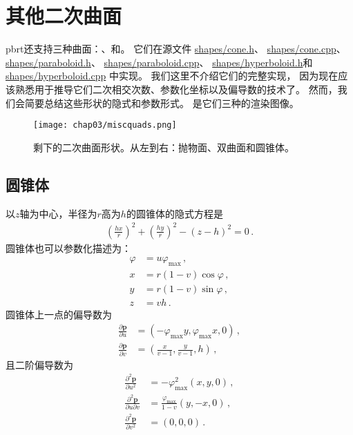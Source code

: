\section{其他二次曲面}\label{sec:其他二次曲面}
pbrt还支持三种曲面：、和。
它们在源文件
\href{https://github.com/mmp/pbrt-v3/tree/master/src/shapes/cone.h}{\ttfamily shapes/cone.h}、
\href{https://github.com/mmp/pbrt-v3/tree/master/src/shapes/cone.cpp}{\ttfamily shapes/cone.cpp}、
\href{https://github.com/mmp/pbrt-v3/tree/master/src/shapes/paraboloid.h}{\ttfamily shapes/paraboloid.h}、
\href{https://github.com/mmp/pbrt-v3/tree/master/src/shapes/paraboloid.cpp}{\ttfamily shapes/paraboloid.cpp}、
\href{https://github.com/mmp/pbrt-v3/tree/master/src/shapes/hyperboloid.h}{\ttfamily shapes/hyperboloid.h}和
\href{https://github.com/mmp/pbrt-v3/tree/master/src/shapes/hyperboloid.cpp}{\ttfamily shapes/hyperboloid.cpp}
中实现。
我们这里不介绍它们的完整实现，
因为现在应该熟悉用于推导它们二次相交次数、参数化坐标以及偏导数的技术了。
然而，我们会简要总结这些形状的隐式和参数形式。
是它们三种的渲染图像。
\begin{figure}[htbp]
    \centering\texttt{[image: chap03/miscquads.png]}
    \caption{剩下的二次曲面形状。从左到右：抛物面、双曲面和圆锥体。}
    \label{fig:3.10}
\end{figure}

\subsection{圆锥体}\label{sub:圆锥体}
以$z$轴为中心，半径为$r$高为$h$的圆锥体的隐式方程是
\begin{align*}
    \left(\frac{hx}{r}\right)^2+\left(\frac{hy}{r}\right)^2-(z-h)^2=0\, .
\end{align*}
圆锥体也可以参数化描述为：
\begin{align*}
    \varphi & =u\varphi_{\max}\, ,   \\
    x       & =r(1-v)\cos\varphi\, , \\
    y       & =r(1-v)\sin\varphi\, , \\
    z       & =vh\, .
\end{align*}
圆锥体上一点的偏导数为
\begin{align*}
    \frac{\partial\bm p}{\partial u} & =(-\varphi_{\max}y,\varphi_{\max}x,0)\, ,       \\
    \frac{\partial\bm p}{\partial v} & =\left(\frac{x}{v-1},\frac{y}{v-1},h\right)\, ,
\end{align*}
且二阶偏导数为
\begin{align*}
    \frac{\partial^2\bm p}{\partial u^2}         & =-\varphi_{\max}^2(x,y,0)\, ,           \\
    \frac{\partial^2\bm p}{\partial u\partial v} & =\frac{\varphi_{\max}}{1-v}(y,-x,0)\, , \\
    \frac{\partial^2\bm p}{\partial v^2}         & =(0,0,0)\, .
\end{align*}

